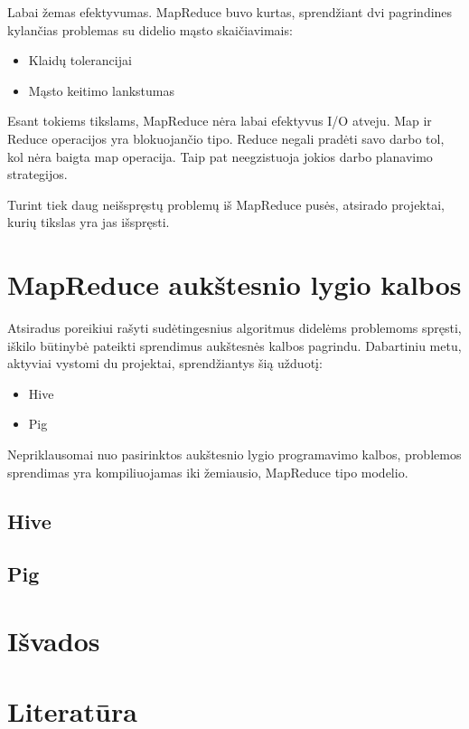 \documentclass[10pt]{IEEEtran}
\begin{document}
		Labai žemas efektyvumas. MapReduce buvo kurtas, sprendžiant dvi pagrindines kylančias problemas su didelio mąsto skaičiavimais:

		\begin{itemize}
			\item Klaidų tolerancijai
			\item Mąsto keitimo lankstumas
		\end{itemize}

		Esant tokiems tikslams, MapReduce nėra labai efektyvus I/O atveju. Map ir Reduce operacijos yra blokuojančio tipo. Reduce negali pradėti savo darbo tol, kol nėra baigta map operacija. Taip pat neegzistuoja jokios darbo planavimo strategijos.

		Turint tiek daug neišspręstų problemų iš MapReduce pusės, atsirado projektai, kurių tikslas yra jas išspręsti. 

	\section{MapReduce aukštesnio lygio kalbos}

		Atsiradus poreikiui rašyti sudėtingesnius algoritmus didelėms problemoms spręsti, iškilo būtinybė pateikti sprendimus aukštesnės kalbos pagrindu. Dabartiniu metu, aktyviai vystomi du projektai, sprendžiantys šią užduotį:

		\begin{itemize}
			\item Hive
			\item Pig
		\end{itemize}

		Nepriklausomai nuo pasirinktos aukštesnio lygio programavimo kalbos, problemos sprendimas yra kompiliuojamas iki žemiausio, MapReduce tipo modelio.

		\subsection{Hive}


		\subsection{Pig}


	\section{Išvados}

	\section{Literatūra}

		
		
\end{document}
